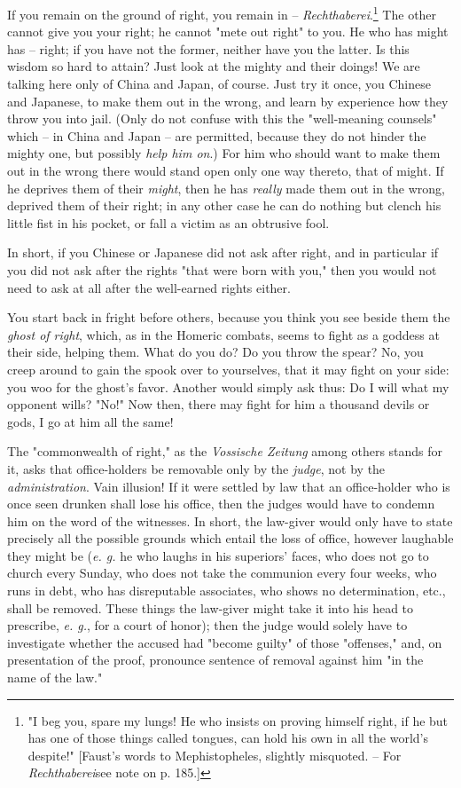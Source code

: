 If you remain on the ground of right, you remain in -- 
\textit{Rechthaberei}.\footnote{"{}I beg you, spare my lungs! He who insists 
on proving himself right, if he but has one of those things called tongues, 
can hold his own in all the world's despite!"{} [Faust's words to 
Mephistopheles, slightly misquoted. -- For \textit{Rechthaberei}see note on p. 
185.]} The other cannot give you your right; he cannot "{}mete out right"{} to 
you. He who has might has -- right; if you have not the former, neither have 
you the latter. Is this wisdom so hard to attain? Just look at the mighty and 
their doings! We are talking here only of China and Japan, of course. Just try 
it once, you Chinese and Japanese, to make them out in the wrong, and learn by 
experience how they throw you into jail. (Only do not confuse with this the 
"{}well-meaning counsels"{} which -- in China and Japan -- are permitted, 
because they do not hinder the mighty one, but possibly \textit{help him on}.) 
For him who should want to make them out in the wrong there would stand open 
only one way thereto, that of might. If he deprives them of their 
\textit{might}, then he has \textit{really} made them out in the wrong, 
deprived them of their right; in any other case he can do nothing but clench 
his little fist in his pocket, or fall a victim as an obtrusive fool.

In short, if you Chinese or Japanese did not ask after right, and in 
particular if you did not ask after the rights "{}that were born with you,"{} 
then you would not need to ask at all after the well-earned rights either.

You start back in fright before others, because you think you see beside them 
the \textit{ghost of right}, which, as in the Homeric combats, seems to fight 
as a goddess at their side, helping them. What do you do? Do you throw the 
spear? No, you creep around to gain the spook over to yourselves, that it may 
fight on your side: you woo for the ghost's favor. Another would simply ask 
thus: Do I will what my opponent wills? "{}No!"{} Now then, there may fight 
for him a thousand devils or gods, I go at him all the same!

The "{}commonwealth of right,"{} as the \textit{Vossische Zeitung} among 
others stands for it, asks that office-holders be removable only by the 
\textit{judge}, not by the \textit{administration}. Vain illusion! If it were 
settled by law that an office-holder who is once seen drunken shall lose his 
office, then the judges would have to condemn him on the word of the 
witnesses. In short, the law-giver would only have to state precisely all the 
possible grounds which entail the loss of office, however laughable they might 
be (\textit{e. g.} he who laughs in his superiors' faces, who does not go to 
church every Sunday, who does not take the communion every four weeks, who 
runs in debt, who has disreputable associates, who shows no determination, 
etc., shall be removed. These things the law-giver might take it into his head 
to prescribe, \textit{e. g.}, for a court of honor); then the judge would 
solely have to investigate whether the accused had "{}become guilty"{} of 
those "{}offenses,"{} and, on presentation of the proof, pronounce sentence of 
removal against him "{}in the name of the law."{}

